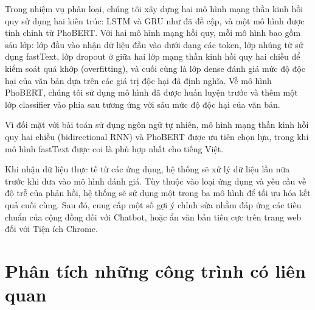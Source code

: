 Trong nhiệm vụ phân loại, chúng tôi xây dựng hai mô hình mạng thần kinh hồi quy sử dụng hai kiến trúc: LSTM và GRU như đã đề cập, và một mô hình được tinh chỉnh từ PhoBERT. Với hai mô hình mạng hồi quy, mỗi mô hình bao gồm sáu lớp: lớp đầu vào nhận dữ liệu đầu vào dưới dạng các token, lớp nhúng từ sử dụng fastText, lớp dropout ở giữa hai lớp mạng thần kinh hồi quy hai chiều để kiểm soát quá khớp (overfitting), và cuối cùng là lớp dense đánh giá mức độ độc hại của văn bản dựa trên các giá trị độc hại đã định nghĩa. Về mô hình PhoBERT, chúng tôi sử dụng mô hình đã được huấn luyện trước và thêm một lớp classifier vào phía sau tương ứng với sáu mức độ độc hại của văn bản.

Vì đối mặt với bài toán sử dụng ngôn ngữ tự nhiên, mô hình mạng thần kinh hồi quy hai chiều (bidirectional RNN) và PhoBERT được ưu tiên chọn lựa, trong khi mô hình fastText được coi là phù hợp nhất cho tiếng Việt.

Khi nhận dữ liệu thực tế từ các ứng dụng, hệ thống sẽ xử lý dữ liệu lần nữa trước khi đưa vào mô hình đánh giá. Tùy thuộc vào loại ứng dụng và yêu cầu về độ trễ của phản hồi, hệ thống sẽ sử dụng một trong ba mô hình để tối ưu hóa kết quả cuối cùng. Sau đó, cung cấp một số gợi ý chỉnh sửa nhằm đáp ứng các tiêu chuẩn của cộng đồng đối với Chatbot, hoặc ẩn văn bản tiêu cực trên trang web đối với Tiện ích Chrome.

\section{Phân tích những công trình có liên quan}


